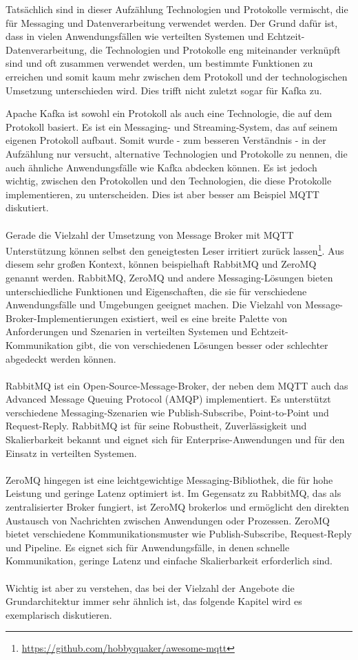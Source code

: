 \documentclass[../vs-script-first-v01.tex]{subfiles}
\begin{document}
Tatsächlich sind in dieser Aufzählung Technologien und Protokolle vermischt, die für Messaging und Datenverarbeitung verwendet werden. Der Grund dafür ist, dass in vielen Anwendungsfällen wie verteilten Systemen und Echtzeit-Datenverarbeitung, die Technologien und Protokolle eng miteinander verknüpft sind und oft zusammen verwendet werden, um bestimmte Funktionen zu erreichen und somit kaum mehr zwischen dem Protokoll und der technologischen Umsetzung unterschieden wird. Dies trifft nicht zuletzt sogar für Kafka zu. 

Apache Kafka ist sowohl ein Protokoll als auch eine Technologie, die auf dem Protokoll basiert. Es ist ein Messaging- und Streaming-System, das auf seinem eigenen Protokoll aufbaut. Somit wurde - zum besseren Verständnis - in der Aufzählung nur versucht, alternative Technologien und Protokolle zu nennen, die auch ähnliche Anwendungsfälle wie Kafka abdecken können. Es ist jedoch wichtig, zwischen den Protokollen und den Technologien, die diese Protokolle implementieren, zu unterscheiden. Dies ist aber besser am Beispiel MQTT diskutiert.
\\\\
Gerade die Vielzahl der Umsetzung von Message Broker mit MQTT Unterstützung können selbst den geneigtesten Leser irritiert zurück lassen\footnote{\url{https://github.com/hobbyquaker/awesome-mqtt}}. Aus diesem sehr großen Kontext, können beispielhaft RabbitMQ und ZeroMQ genannt werden. RabbitMQ, ZeroMQ und andere Messaging-Lösungen bieten unterschiedliche Funktionen und Eigenschaften, die sie für verschiedene Anwendungsfälle und Umgebungen geeignet machen. Die Vielzahl von Message-Broker-Implementierungen existiert, weil es eine breite Palette von Anforderungen und Szenarien in verteilten Systemen und Echtzeit-Kommunikation gibt, die von verschiedenen Lösungen besser oder schlechter abgedeckt werden können.
\\\\
RabbitMQ ist ein Open-Source-Message-Broker, der neben dem MQTT auch das Advanced Message Queuing Protocol (AMQP) implementiert. Es unterstützt verschiedene Messaging-Szenarien wie Publish-Subscribe, Point-to-Point und Request-Reply. RabbitMQ ist für seine Robustheit, Zuverlässigkeit und Skalierbarkeit bekannt und eignet sich für Enterprise-Anwendungen und für den Einsatz in verteilten Systemen.
\\\\
ZeroMQ hingegen ist eine leichtgewichtige Messaging-Bibliothek, die für hohe Leistung und geringe Latenz optimiert ist. Im Gegensatz zu RabbitMQ, das als zentralisierter Broker fungiert, ist ZeroMQ brokerlos und ermöglicht den direkten Austausch von Nachrichten zwischen Anwendungen oder Prozessen. ZeroMQ bietet verschiedene Kommunikationsmuster wie Publish-Subscribe, Request-Reply und Pipeline. Es eignet sich für Anwendungsfälle, in denen schnelle Kommunikation, geringe Latenz und einfache Skalierbarkeit erforderlich sind.
\\\\
Wichtig ist aber zu verstehen, das bei der Vielzahl der Angebote die Grundarchitektur immer sehr ähnlich ist, das folgende Kapitel wird es exemplarisch diskutieren.
\end{document}
